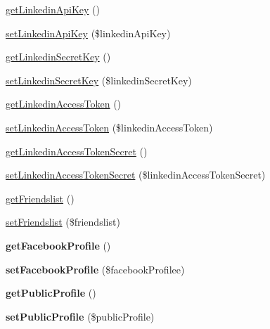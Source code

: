\begin{DoxyCompactItemize}
\item 
\hyperlink{class_social_a14de4aea6c228bdd39c3ae5548a9aac7}{get\+Linkedin\+Api\+Key} ()
\item 
\hyperlink{class_social_a933ba1ba3da035eeee26d204a78f4f5e}{set\+Linkedin\+Api\+Key} (\$linkedin\+Api\+Key)
\item 
\hyperlink{class_social_ade42597aeb3ea2b7438ba6e443bf3453}{get\+Linkedin\+Secret\+Key} ()
\item 
\hyperlink{class_social_a4ebeae591761bec743d39d90b38c6eec}{set\+Linkedin\+Secret\+Key} (\$linkedin\+Secret\+Key)
\item 
\hyperlink{class_social_a03db92318028e3afb18ce5bce8a3f5bf}{get\+Linkedin\+Access\+Token} ()
\item 
\hyperlink{class_social_a66e7e2b0a58f82ac52f3bd6949851696}{set\+Linkedin\+Access\+Token} (\$linkedin\+Access\+Token)
\item 
\hyperlink{class_social_acf38205b308f87ee75ef0c1b0eb3f1ae}{get\+Linkedin\+Access\+Token\+Secret} ()
\item 
\hyperlink{class_social_a247b6bb0eda5d9f36561a2deb8683dc6}{set\+Linkedin\+Access\+Token\+Secret} (\$linkedin\+Access\+Token\+Secret)
\item 
\hyperlink{class_social_a880fa8e0f8e837265b8e39662507ff26}{get\+Friendslist} ()
\item 
\hyperlink{class_social_a8202f0f9153925edb442480041cba960}{set\+Friendslist} (\$friendslist)
\item 
\hypertarget{class_social_ab81d8838835b082636e3c77b4dfcc55b}{{\bfseries get\+Facebook\+Profile} ()}\label{class_social_ab81d8838835b082636e3c77b4dfcc55b}

\item 
\hypertarget{class_social_a30ca9a3e8c55138b4c7c625b7e916c46}{{\bfseries set\+Facebook\+Profile} (\$facebook\+Profilee)}\label{class_social_a30ca9a3e8c55138b4c7c625b7e916c46}

\item 
\hypertarget{class_social_a600ed4be99b38e34c7f03cd270578696}{{\bfseries get\+Public\+Profile} ()}\label{class_social_a600ed4be99b38e34c7f03cd270578696}

\item 
\hypertarget{class_social_ad144b783bf98639509dca96b66a52388}{{\bfseries set\+Public\+Profile} (\$public\+Profile)}\label{class_social_ad144b783bf98639509dca96b66a52388}

\end{DoxyCompactItemize}
